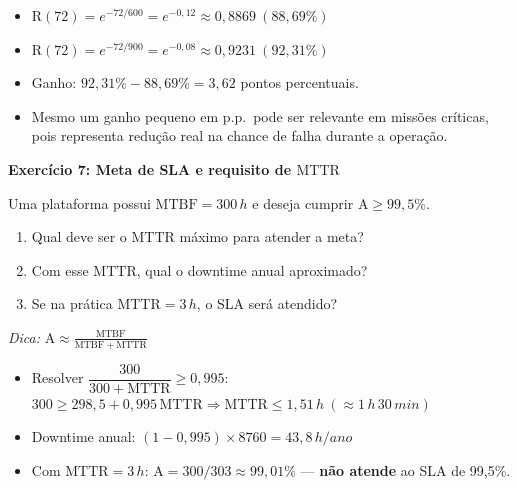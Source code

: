 \documentclass[10pt,a4paper]{article}
\newcommand{\R}{\mathrm{R}}
\newcommand{\A}{\mathrm{A}}
\newcommand{\MTBF}{\mathrm{MTBF}}
\newcommand{\MTTR}{\mathrm{MTTR}}
\begin{document}
\begin{solucao}
\begin{itemize}
  \item \(\R(72) = e^{-72/600} = e^{-0{,}12} \approx 0{,}8869\ (88{,}69\%)\)
  \item \(\R(72) = e^{-72/900} = e^{-0{,}08} \approx 0{,}9231\ (92{,}31\%)\)
  \item Ganho: \(92{,}31\% - 88{,}69\% = 3{,}62\) pontos percentuais.
  \item Mesmo um ganho pequeno em p.p.\ pode ser relevante em missões críticas, pois representa redução real na chance de falha durante a operação.
\end{itemize}
\end{solucao}

\vspace{4pt}

\textbf{Exercício 7: Meta de SLA e requisito de \(\MTTR\)}

Uma plataforma possui \(\MTBF=300\,h\) e deseja cumprir \(\A \ge 99{,}5\%\).
\begin{enumerate}
  \item Qual deve ser o \(\MTTR\) máximo para atender a meta?
  \item Com esse \(\MTTR\), qual o downtime anual aproximado?
  \item Se na prática \(\MTTR=3\,h\), o SLA será atendido?
\end{enumerate}
\textit{Dica:} \(\displaystyle\A \approx \frac{\MTBF}{\MTBF+\MTTR}\)

\begin{solucao}
\begin{itemize}
  \item Resolver \(\dfrac{300}{300+\MTTR} \ge 0{,}995\): \quad
    \(300 \ge 298{,}5 + 0{,}995\,\MTTR \Rightarrow \MTTR \le 1{,}51\,h\ (\approx 1\,h\,30\,min)\)
  \item Downtime anual: \((1 - 0{,}995) \times 8760 = 43{,}8\,h/ano\)
  \item Com \(\MTTR=3\,h\): \(\A = 300/303 \approx 99{,}01\%\) — \textbf{não atende} ao SLA de 99,5\%.
\end{itemize}
\end{solucao}
\end{document}
